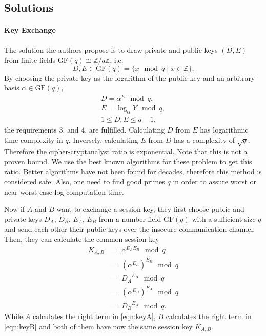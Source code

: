 \documentclass[paper=a4, fontsize=11pt]{scrartcl} %
\numberwithin{equation}{section} %
\numberwithin{figure}{section} %
\numberwithin{table}{section} %
\begin{document}
\subsection{Solutions}
\paragraph{Key Exchange}
The solution the authors propose is to draw private and public keys $(D,E)$ from finite fields $\mathrm{GF}(q)\cong\mathbb{Z}/q\mathbb{Z}$, i.e.
\begin{equation}
D, E \in \mathrm{GF}(q) = \{x \mod q \mid x \in \mathbb{Z}\}.
\end{equation}
By choosing the private key as the logarithm of the public key and an arbitrary basis $\alpha \in \mathrm{GF}(q)$,
\begin{eqnarray}
D = \alpha^E\mod q,\\
E = \log_\alpha Y \mod q,\\
1 \leq D,E \leq q-1,
\end{eqnarray}
the requirements 3. and 4. are fulfilled. Calculating $D$ from $E$ has logarithmic time complexity in $q$. Inversely, calculating $E$ from $D$ has a complexity of $\sqrt{q}$. Therefore the cipher-cryptanalyst ratio is exponential. Note that this is not a proven bound. We use the best known algorithms for these problem to get this ratio. Better algorithms have not been found for decades, therefore this method is considered safe. Also, one need to find good primes $q$ in order to assure worst or near worst case log-computation time.

Now if $A$ and $B$ want to exchange a session key, they first choose public and private keys $D_A$, $D_B$, $E_A$, $E_B$ from a number field $\mathrm{GF}(q)$ with a sufficient size $q$ and send each other their public keys over the insecure communication channel. Then, they can calculate the common session key
\begin{eqnarray}
K_{A,B} & = & \alpha^{E_AE_B} \mod q\\
& = & (\alpha^{E_A})^{E_B} \mod q\\
& = & {D_A}^{E_B} \mod q\label{eqn:keyA}\\
& = & (\alpha^{E_B})^{E_A} \mod q\\
& = & {D_B}^{E_A} \mod q.\label{eqn:keyB}
\end{eqnarray}
While $A$ calculates the right term in \ref{eqn:keyA}, $B$ calculates the right term in \ref{eqn:keyB} and both of them have now the same session key $K_{A,B}$.
\end{document}
